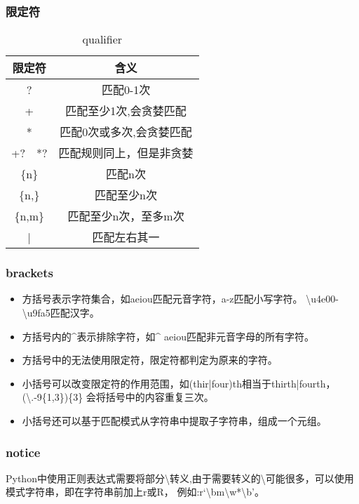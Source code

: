 \documentclass{article}
\begin{document}
      \subsubsection{限定符}
        \begin{table}[H]
          \centering
          \caption{qualifier}
          \label{tab:qualifier}
          \begin{tabular}{cc}
            \toprule[1.5pt]
            限定符 & 含义 \\
            \midrule
            ? & 匹配0-1次 \\
            + & 匹配至少1次,会贪婪匹配 \\
            * & 匹配0次或多次,会贪婪匹配 \\
            +?~~*? & 匹配规则同上，但是非贪婪 \\
            \{n\} & 匹配n次 \\
            \{n,\} & 匹配至少n次 \\
            \{n,m\} & 匹配至少n次，至多m次 \\
            | & 匹配左右其一 \\
            \bottomrule[1.5pt]
          \end{tabular}
        \end{table}

      \subsubsection{brackets}
        \begin{itemize}
          \item 方括号表示字符集合，如\lbrack aeiou\rbrack 匹配元音字符，\lbrack a-z\rbrack 匹配小写字符。
            \lbrack\textbackslash u4e00-\textbackslash u9fa5\rbrack 匹配汉字。
          \item 方括号内的\^{}表示排除字符，如\lbrack\^{} aeiou\rbrack 匹配非元音字母的所有字符。
          \item 方括号中的无法使用限定符，限定符都判定为原来的字符。
          \item 小括号可以改变限定符的作用范围，如(thir|four)th相当于thirth|fourth，(\textbackslash .-9\rbrack\{1,3\})\{3\}
            会将括号中的内容重复三次。
          \item 小括号还可以基于匹配模式从字符串中提取子字符串，组成一个元组。
        \end{itemize}

      \subsubsection{notice}
        Python中使用正则表达式需要将部分\textbackslash 转义,由于需要转义的\textbackslash 可能很多，可以使用模式字符串，即在字符串前加上r或R，
        例如:r`\textbackslash bm\textbackslash w*\textbackslash b'。
\end{document}
